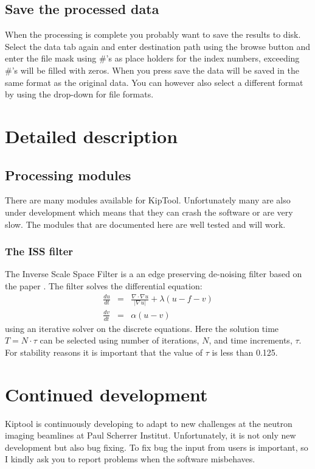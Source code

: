 \documentclass[a4paper]{scrreprt}
\begin{document}
\section{Save the processed data}
When the processing is complete you probably want to save the results to disk. Select the data tab again and enter destination path using the browse button and enter the file mask using \#'s as place holders for the index numbers, exceeding \#'s will be filled with zeros. When you press save the data will be saved in the same format as the original data. You can however also select a different format by using the drop-down for file formats. 

\chapter{Detailed description}
\section{Processing modules}
There are many modules available for KipTool. Unfortunately many are also under development which means that they can crash the software or are very slow. The modules that are documented here are well tested and will work.
\subsection{The ISS filter}
The Inverse Scale Space Filter is a an edge preserving de-noising filter based on the paper \cite{burger2006}. The filter solves the differential equation:
\begin{eqnarray}
\frac{du}{dt}&=&\frac{\nabla\cdot \nabla u}{|\nabla u|} + \lambda(u-f-v)\nonumber\\
\frac{dv}{dt}&=&\alpha (u-v)
\end{eqnarray}
using an iterative solver on the discrete equations. Here the solution time $T=N\cdot\tau$ can be selected using number of iterations, $N$, and time increments, $\tau$. For stability reasons it is important that the value of $\tau$ is less than 0.125.

\chapter{Continued development}
Kiptool is continuously developing to adapt to new challenges at the neutron
imaging beamlines at Paul Scherrer Institut. Unfortunately, it is not only new
development but also bug fixing. To fix bug the input from users is important,
so I kindly ask you to report problems when the software misbehaves.
\end{document}
